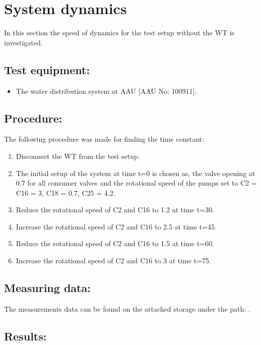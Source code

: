 \section{System dynamics}
\label{sec:pipe_dynamics}

In this section the speed of dynamics for the test setup without the WT is investigated.

\subsection*{Test equipment:}
\begin{itemize}
\item The water distribution system at AAU [AAU No: 100911].
\end{itemize}

\subsection*{Procedure:}
The following procedure was made for finding the time constant:
\begin{enumerate}
\item Disconnect the WT from the test setup.  
\item The initial setup of the system at time t=0 is chosen as, the valve opening at 0.7 for all consumer valves and the rotational speed of the pumps set to C2 = C16 = 3, C18 = 0.7, C25 = 4.2.
\item Reduce the rotational speed of C2 and C16 to 1.2 at time t=30.
\item Increase the rotational speed of C2 and C16 to 2.5 at time t=45.
\item Reduce the rotational speed of C2 and C16 to 1.5 at time t=60.
\item Increase the rotational speed of C2 and C16 to 3 at time t=75.
\end{enumerate}

\subsection*{Measuring data:}
The measurements data can be found on the attached storage under the path: .

\subsection*{Results:}

